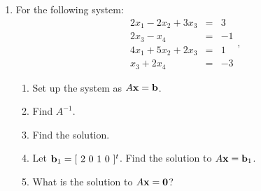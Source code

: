 \begin{enumerate}
\item For the following system:
$$\begin{array}{rrr} 2x_1-2x_2+3x_3&=&3\\ 2x_3-x_4&=&-1\\
4x_1+5x_2+2x_3&=&1\\ x_3+2x_4&=&-3 \end{array},$$
\begin{enumerate}
\item Set up the system as $A{\bf x}={\bf b}$.
\item Find $A^{-1}.$
\item Find the solution.
\item Let ${\bf b}_1=[ \ 2 \ 0 \ 1 \ 0 \ ]^t$. Find the solution
to $A{\bf x}={\bf  b}_1$.
\item What is the solution to $A{\bf x}={\bf 0}$?
\end{enumerate}


\end{enumerate}
